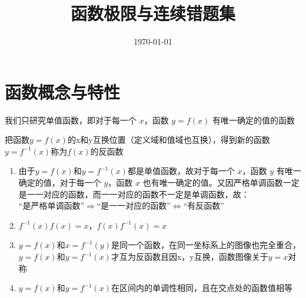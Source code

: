 \documentclass{ctexart}
\title{函数极限与连续错题集}
\date{\today}
\begin{document}
\maketitle

\section{函数概念与特性}

\begin{theorem}[函数]
    我们只研究单值函数，即对于每一个 $x$，函数 $y=f(x)$ 有唯一确定的值的函数
\end{theorem}

\begin{theorem}[反函数]
    把函数$y=f(x)$的x和y互换位置（定义域和值域也互换），得到新的函数$y=f^{-1}(x)$称为$f(x)$的反函数    
    \begin{enumerate}
        \item 由于$y=f(x)$和$y=f^{-1}(x)$都是单值函数，故对于每一个 $x$，函数 $y$ 有唯一确定的值，对于每一个 $y$，函数 $x$ 也有唯一确定的值。又因严格单调函数一定是一一对应的函数，而一一对应的函数不一定是单调函数，故：\\
        “是严格单调函数”$\Rightarrow$“是一一对应的函数”$\Leftrightarrow$“有反函数”
        \item $f^{-1}(x)f(x)=x$，$f(x)f^{-1}(x)=x$
        \item $y=f(x)$和$x=f^{-1}(y)$是同一个函数，在同一坐标系上的图像也完全重合，$y=f(x)$和$y=f^{-1}(x)$才互为反函数且因x，y互换，函数图像关于$y=x$对称
        \item $y=f(x)$和$y=f^{-1}(x)$在区间内的单调性相同，且在交点处的函数值相等
    \end{enumerate}
\end{theorem}
\end{document}
